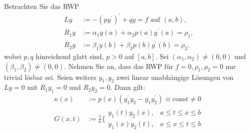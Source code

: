 \begin{exercise}
Betrachten Sie das RWP
\begin{align*}
  Ly &:= -(py^{\prime})^{\prime} + qy = f \text{ auf } (a,b), \\
  R_1y &:= \alpha_1y(a) + \alpha_2p(a)y^{\prime}(a) = \rho_1, \\
  R_2y &:= \beta_1y(b) + \beta_2p(b)y^{\prime}(b) = \rho_2,
\end{align*}
wobei $p,q$ hinreichend glatt sind, $p > 0$ auf $[a,b]$. Sei $(\alpha_1,\alpha_2) \neq (0,0)$
und $(\beta_1,\beta_2) \neq (0,0)$. Nehmen Sie an, dass das RWP für $f = 0, \rho_1,\rho_2 = 0$
nur trivial lösbar sei. Seien weiters $y_1,y_2$ zwei linear unabhängige Lösungen
von $Ly = 0$ mit $R_1y_1 = 0$ und $R_2y_2 = 0$. Dann gilt:
\begin{align*}
  \kappa(x) &:= p(x)(y_1^{\prime}y_2 - y_1y_2^{\prime}) \equiv \text{const} \neq 0 \\
  G(x,t) &:= \frac{1}{\kappa}\Bigg\{\begin{matrix}
    y_1(t)y_2(x), & a \leq t \leq x \leq b \\
    y_1(x)y_2(t), & a \leq x \leq t \leq b
  \end{matrix}
\end{align*}
\end{exercise}

